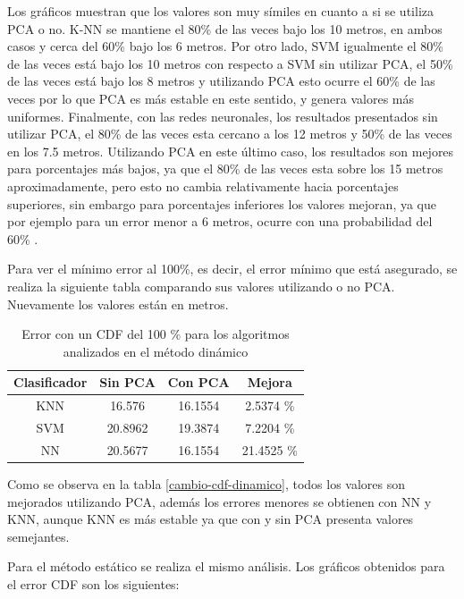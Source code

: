 Los gráficos muestran que los valores son muy símiles en cuanto a si se utiliza PCA o no. K-NN se mantiene el 80\% de las veces bajo los 10 metros, en ambos casos y cerca del 60\% bajo los 6 metros. Por otro lado, SVM igualmente el 80\% de las veces está bajo los 10 metros con respecto a SVM sin utilizar PCA, el 50\% de las veces está bajo los 8 metros y utilizando PCA esto ocurre el 60\% de las veces por lo que PCA es más estable en este sentido, y genera valores más uniformes. Finalmente, con las redes neuronales, los resultados presentados sin utilizar PCA, el 80\% de las veces esta cercano a los 12 metros y 50\% de las veces en los 7.5 metros. Utilizando PCA en este último caso, los resultados son mejores para porcentajes más bajos, ya que el 80\% de las veces esta sobre los 15 metros aproximadamente,  pero esto no cambia relativamente hacia porcentajes superiores, sin embargo para porcentajes inferiores los valores mejoran, ya que por ejemplo para un error menor a 6 metros, ocurre con una probabilidad del 60\% .

Para ver el mínimo error al 100\%, es decir, el error mínimo que está asegurado, se realiza la siguiente tabla comparando sus valores utilizando o no PCA. Nuevamente los valores están en metros.

\begin{table}[!h]
\centering
\caption[Error con un CDF del 100 \% para los algoritmos analizados  en el método dinámico]{Error con un CDF del 100 \% para los algoritmos analizados  en el método dinámico}
\label{cambio-cdf-dinamico}
\begin{tabular}{|c|c|c|c|}
\hline
Clasificador & Sin PCA & Con PCA & Mejora     \\ \hline
KNN          & 16.576  & 16.1554 & 2.5374 \%  \\ \hline
SVM          & 20.8962 & 19.3874 & 7.2204 \%  \\ \hline
NN           & 20.5677 & 16.1554 & 21.4525 \% \\ \hline
\end{tabular}
\end{table}


Como se observa en la tabla \autoref{cambio-cdf-dinamico}, todos los valores son mejorados utilizando PCA, además los errores menores se obtienen con NN y KNN, aunque KNN es más estable ya que con y sin PCA presenta valores semejantes.

Para el método estático se realiza el mismo análisis. Los gráficos obtenidos para el error CDF son los siguientes:

